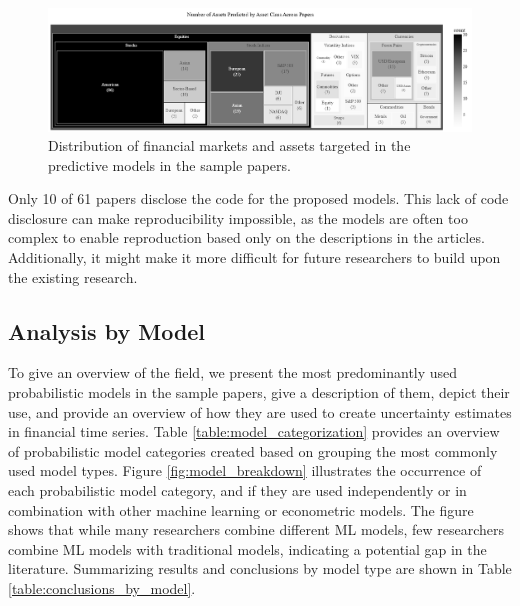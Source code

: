 \begin{figure}[h]
    \centering
    \includegraphics[width=1\linewidth]{Images/treemap_asset_by_market.png}
    \caption{Distribution of financial markets and assets targeted in the predictive models in the sample papers. }
    \label{fig:treemap_asset_by_market}
\end{figure}

Only 10 of 61 papers disclose the code for the proposed models. This lack of code disclosure can make reproducibility impossible, as the models are often too complex to enable reproduction based only on the descriptions in the articles. Additionally, it might make it more difficult for future researchers to build upon the existing research.





\subsection{Analysis by Model}
\label{sec:analysis_by_model}
To give an overview of the field, we present the most predominantly used probabilistic models in the sample papers, give a description of them, depict their use, and provide an overview of how they are used to create uncertainty estimates in financial time series. Table \ref{table:model_categorization} provides an overview of probabilistic model categories created based on grouping the most commonly used model types. Figure \ref{fig:model_breakdown} illustrates the occurrence of each probabilistic model category, and if they are used independently or in combination with other machine learning or econometric models. The figure shows that while many researchers combine different ML models, few researchers combine ML models with traditional models, indicating a potential gap in the literature. Summarizing results and conclusions by model type are shown in Table \ref{table:conclusions_by_model}.

